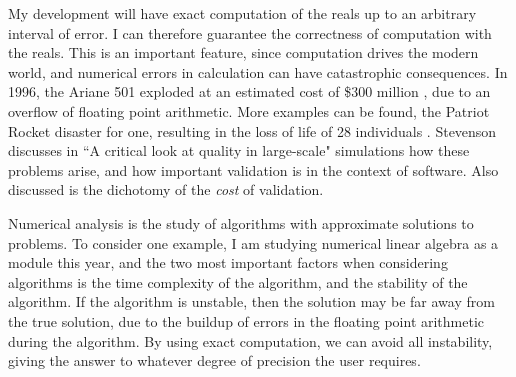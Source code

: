 \documentclass[ProjectReport]{subfiles}
\begin{document}


My development will have exact computation of the reals up to an arbitrary interval of error. I can therefore guarantee the correctness of computation with the reals. This is an important feature, since computation drives the modern world, and numerical errors in calculation can have catastrophic consequences. In 1996, the Ariane 501 exploded at an estimated cost of \$300 million \cite{ARIANE1}, due to an overflow of floating point arithmetic. More examples can be found, the Patriot Rocket disaster for one, resulting in the loss of life of 28 individuals \cite{office_patriot_nodate}. Stevenson discusses in ``A critical look at quality in large-scale" simulations \cite{QualityInSimulation} how these problems arise, and how important validation is in the context of software. Also discussed is the dichotomy of the \textit{cost} of validation. 

Numerical analysis is the study of algorithms with approximate solutions to problems. To consider one example, I am studying numerical linear algebra as a module this year, and the two most important factors when considering algorithms is the time complexity of the algorithm, and the stability of the algorithm. If the algorithm is unstable, then the solution may be far away from the true solution, due to the buildup of errors in the floating point arithmetic during the algorithm. By using exact computation, we can avoid all instability, giving the answer to whatever degree of precision the user requires.
\end{document}
